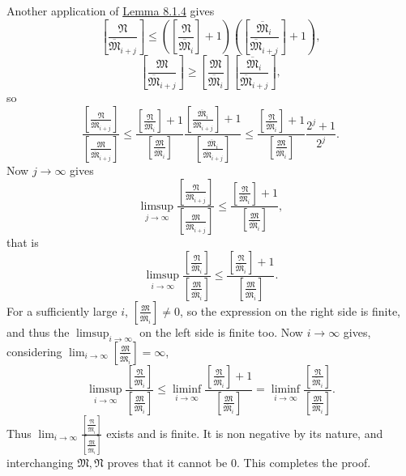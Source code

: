 \documentclass[12pt,b5paper,twoside]{article}
\newcommand{\reldiv}[2]{\left[\frac{#1}{#2}\right]}
\newcommand{\lemref}[1]{\hyperref[lem:#1]{Lemma #1}}
\begin{document}
Another application of \lemref{8.1.4} gives
\[
 \reldiv{\mathfrak N}{\overline{\mathfrak M}_{i+j}}
 \leq
 \left(\reldiv{\mathfrak N}{\overline{\mathfrak M}_i}+1\right)
 \left(\reldiv{\overline{\mathfrak M}_i}{\overline{\mathfrak M}_{i+j}}+1\right),
\]
\[
 \reldiv{\mathfrak M}{\overline{\mathfrak M}_{i+j}}
 \geq
 \reldiv{\mathfrak M}{\overline{\mathfrak M}_i}
 \reldiv{\overline{\mathfrak M}_i}{\overline{\mathfrak M}_{i+j}},
\]
so
\[
 \frac{\reldiv{\mathfrak N}{\overline{\mathfrak M}_{i+j}}}
      {\reldiv{\mathfrak M}{\overline{\mathfrak M}_{i+j}}}
 \leq
 \frac{\reldiv{\mathfrak N}{\overline{\mathfrak M}_i}+1}
      {\reldiv{\mathfrak M}{\overline{\mathfrak M}_i}}
 \frac{\reldiv{\overline{\mathfrak M}_i}{\overline{\mathfrak M}_{i+j}}+1}
      {\reldiv{\overline{\mathfrak M}_i}{\overline{\mathfrak M}_{i+j}}}
 \leq
 \frac{\reldiv{\mathfrak N}{\overline{\mathfrak M}_i}+1}
      {\reldiv{\mathfrak M}{\overline{\mathfrak M}_i}}
 \frac{2^j+1}{2^j}.
\]
Now $j\to\infty$ gives
\[
 \limsup_{j\to\infty}
 \frac{\reldiv{\mathfrak N}{\overline{\mathfrak M}_{i+j}}}
      {\reldiv{\mathfrak M}{\overline{\mathfrak M}_{i+j}}}
 \leq
 \frac{\reldiv{\mathfrak N}{\overline{\mathfrak M}_i}+1}
      {\reldiv{\mathfrak M}{\overline{\mathfrak M}_i}},
\]
that is
\[
 \limsup_{i\to\infty}
 \frac{\reldiv{\mathfrak N}{\overline{\mathfrak M}_i}}
      {\reldiv{\mathfrak M}{\overline{\mathfrak M}_i}}
 \leq
 \frac{\reldiv{\mathfrak N}{\overline{\mathfrak M}_i}+1}
      {\reldiv{\mathfrak M}{\overline{\mathfrak M}_i}}.
\]
For a sufficiently large $i$,
$\reldiv{\mathfrak M}{\overline{\mathfrak M}_i}\ne0$, so the expression on
the right side is finite, and thus the $\limsup_{i\to\infty}$ on the left side is
finite too. Now $i\to\infty$ gives, considering
$\lim_{i\to\infty}\reldiv{\mathfrak M}{\overline{\mathfrak M}_i}=\infty$,
\[
 \limsup_{i\to\infty}
 \frac{\reldiv{\mathfrak N}{\overline{\mathfrak M}_i}}
      {\reldiv{\mathfrak M}{\overline{\mathfrak M}_i}}
 \leq
 \liminf_{i\to\infty}
 \frac{\reldiv{\mathfrak N}{\overline{\mathfrak M}_i}+1}
      {\reldiv{\mathfrak M}{\overline{\mathfrak M}_i}}
 =
 \liminf_{i\to\infty}
 \frac{\reldiv{\mathfrak N}{\overline{\mathfrak M}_i}}
      {\reldiv{\mathfrak M}{\overline{\mathfrak M}_i}}.
\]
Thus \hyperref[eq:8.1.1]{\(\displaystyle
\lim_{i\to\infty}
\frac{\reldiv{\mathfrak N}{\overline{\mathfrak M}_i}}
     {\reldiv{\mathfrak M}{\overline{\mathfrak M}_i}}\)}
exists and is finite. It is non negative by
its nature, and interchanging $\mathfrak M,\mathfrak N$ proves that it cannot
be $0$. This completes the proof.
\end{document}
